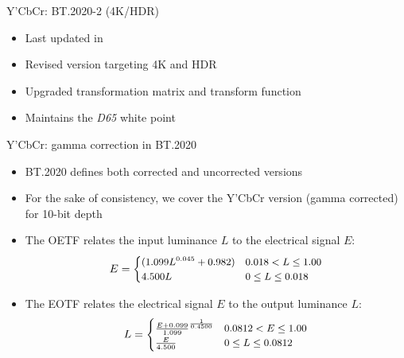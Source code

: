 \documentclass[aspectratio=169,handout,usepdftitle=false]{fireshonks}
\begin{document}
\begin{frame}{Y'CbCr: BT.2020-2 (4K/HDR)}
    \begin{itemize}
        \item Last updated in \cite*{BT2020}
        \item Revised version targeting 4K and HDR
        \item Upgraded transformation matrix and transform function
        \item Maintains the \emph{D65} white point
    \end{itemize}

\end{frame}
\begin{frame}{Y'CbCr: gamma correction in BT.2020}
    \begin{itemize}
        \item BT.2020 defines both corrected and uncorrected versions
        \item For the sake of consistency, we cover the Y'CbCr version (gamma corrected) for 10-bit depth
        \item The OETF relates the input luminance $L$ to the electrical signal $E$: \begin{equation}
                  \small
                  E = \begin{cases}
                      (1.099L^{0.045} + 0.982) & 0.018 < L \leq 1.00 \\
                      4.500L                   & 0 \leq L \leq 0.018
                  \end{cases}
              \end{equation}
        \item The EOTF relates the electrical signal $E$ to the output luminance $L$: \begin{equation}
                  \small
                  L = \begin{cases}
                      \frac{E + 0.099}{1.099}^\frac{1}{0.4500} & 0.0812 < E \leq 1.00 \\
                      \frac{E}{4.500}                          & 0 \leq L \leq 0.0812
                  \end{cases}
              \end{equation}
    \end{itemize}
\end{frame}
\end{document}
